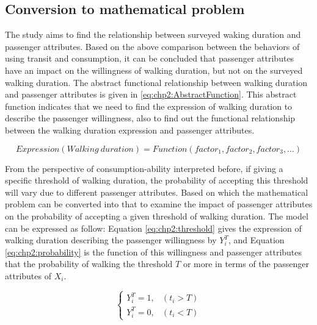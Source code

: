 \subsection{Conversion to mathematical problem}
The study aims to find the relationship between surveyed waking duration and passenger attributes. Based on the above comparison between the behaviors of using transit and consumption, it can be concluded that passenger attributes have an impact on the willingness of walking duration, but not on the surveyed walking duration. The abstract functional relationship between walking duration and passenger attributes is given in \ref{eq:chp2:AbstractFunction}. This abstract function indicates that we need to find the expression of walking duration to describe the passenger willingness, also to find out the functional relationship between the walking duration expression and passenger attributes.

\begin{equation}
Expression(Walking\ duration) = Function({factor}_1, {factor}_2, {factor}_3, \ldots)
\label{eq:chp2:AbstractFunction}
\end{equation}

From the perspective of consumption-ability interpreted before, if giving a specific threshold of walking duration, the probability of accepting this threshold will vary due to different passenger attributes. Based on which the mathematical problem can be converted into that to examine the impact of passenger attributes on the probability of accepting a given threshold of walking duration. The model can be expressed as follow: Equation \ref{eq:chp2:threshold} gives the expression of walking duration describing the passenger willingness by $Y^T_i$, and Equation \ref{eq:chp2:probability} is the function of this willingness and passenger attributes that the probability of walking the threshold $T$ or more in terms of the passenger attributes of $X_i$.

\begin{equation}
\left\{\begin{matrix}
Y^T_i=1,&(t_i>T) \\
Y^T_i=0,&(t_i<T)
\end{matrix}\right.
\label{eq:chp2:threshold}
\end{equation}

